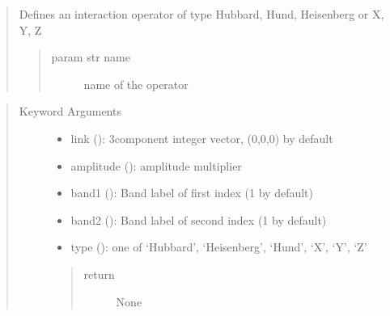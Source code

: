 \documentclass[letterpaper,10pt,english]{sphinxmanual}
\begin{document}
\begin{fulllineitems}
\label{\detokenize{functions:pyqcm.interaction_operator}}\begin{quote}

\sphinxAtStartPar
Defines an interaction operator of type Hubbard, Hund, Heisenberg or X, Y, Z
\begin{quote}\begin{description}
\item[{param str name}] \leavevmode
\sphinxAtStartPar
name of the operator

\end{description}\end{quote}
\end{quote}
\begin{quote}\begin{description}
\item[{Keyword Arguments}] \leavevmode\begin{itemize}
\item {} 
\sphinxAtStartPar
link (\sphinxstyleemphasis{{[}int{]}}): 3\sphinxhyphen{}component integer vector, (0,0,0) by default

\item {} 
\sphinxAtStartPar
amplitude (): amplitude multiplier

\item {} 
\sphinxAtStartPar
band1 (): Band label of first index (1 by default)

\item {} 
\sphinxAtStartPar
band2 (): Band label of second index (1 by default)

\item {} 
\sphinxAtStartPar
type (): one of ‘Hubbard’, ‘Heisenberg’, ‘Hund’, ‘X’, ‘Y’, ‘Z’

\end{itemize}
\begin{quote}\begin{description}
\item[{return}] \leavevmode
\sphinxAtStartPar
None

\end{description}\end{quote}

\end{description}\end{quote}

\end{fulllineitems}
\end{document}
